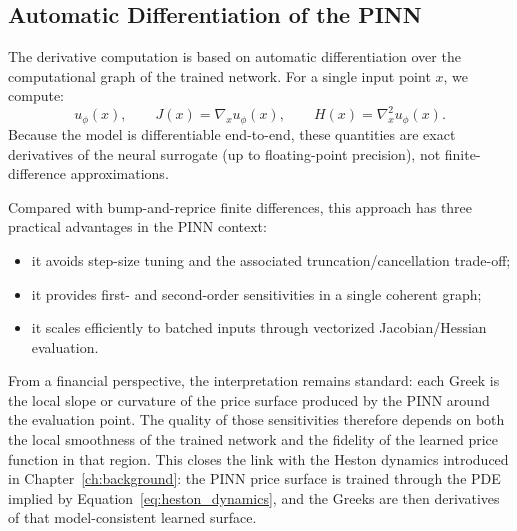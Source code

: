 \subsection{Automatic Differentiation of the PINN}

The derivative computation is based on automatic differentiation over the computational graph of the trained network. For a single input point \(x\), we compute:
\[
u_\phi(x),\qquad J(x)=\nabla_x u_\phi(x),\qquad H(x)=\nabla_x^2 u_\phi(x).
\]
Because the model is differentiable end-to-end, these quantities are exact derivatives of the neural surrogate (up to floating-point precision), not finite-difference approximations.

Compared with bump-and-reprice finite differences, this approach has three practical advantages in the PINN context:
\begin{itemize}
    \item it avoids step-size tuning and the associated truncation/cancellation trade-off;
    \item it provides first- and second-order sensitivities in a single coherent graph;
    \item it scales efficiently to batched inputs through vectorized Jacobian/Hessian evaluation.
\end{itemize}

From a financial perspective, the interpretation remains standard: each Greek is the local slope or curvature of the price surface produced by the PINN around the evaluation point. The quality of those sensitivities therefore depends on both the local smoothness of the trained network and the fidelity of the learned price function in that region.
This closes the link with the Heston dynamics introduced in Chapter~\ref{ch:background}: the PINN price surface is trained through the PDE implied by Equation~\ref{eq:heston_dynamics}, and the Greeks are then derivatives of that model-consistent learned surface.
